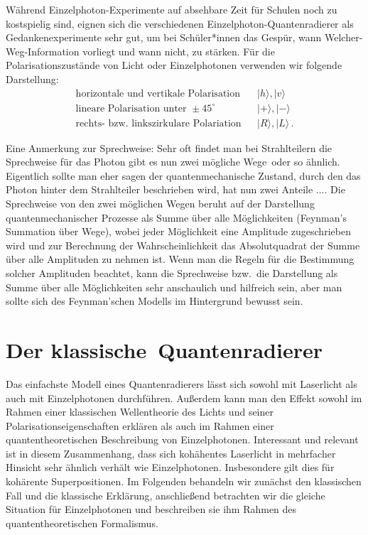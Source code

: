 W\"ahrend Einzelphoton-Experimente auf absehbare Zeit f\"ur Schulen noch zu kostspielig sind,
eignen sich die verschiedenen Einzelphoton-Quantenradierer als Gedankenexperimente 
sehr gut, um bei Sch\"uler*innen
das Gesp\"ur, wann \glqq Welcher-Weg\grqq-Information vorliegt und wann nicht, zu st\"arken.
F\"ur die Polarisationszust\"ande von Licht oder Einzelphotonen verwenden wir folgende
Darstellung:
\begin{eqnarray}
   \mbox{horizontale und vertikale Polarisation} & & |h\rangle , |v \rangle \\
   \mbox{lineare Polarisation unter } \pm 45^\circ & & |+\rangle , | - \rangle \\
   \mbox{rechts- bzw.\ linkszirkulare Polariation} & & |R\rangle , |L \rangle \, .
\end{eqnarray}

Eine Anmerkung zur Sprechweise: Sehr oft findet man bei Strahlteilern die Sprechweise
\glqq f\"ur das Photon gibt es nun zwei m\"ogliche Wege\grqq\ oder so \"ahnlich. Eigentlich
sollte man eher sagen \glqq der quantenmechanische Zustand, durch den das Photon hinter 
dem Strahlteiler beschrieben wird, hat nun zwei Anteile ...\grqq. Die Sprechweise von den
zwei m\"oglichen Wegen beruht auf der Darstellung quantenmechanischer Prozesse
als Summe \"uber alle M\"oglichkeiten 
(Feynman's Summation \"uber Wege),
wobei jeder M\"oglichkeit eine Amplitude zugeschrieben wird und zur Berechnung der
Wahrscheinlichkeit das Absolutquadrat der Summe \"uber alle Amplituden zu nehmen ist. 
Wenn man die Regeln f\"ur die Bestimmung solcher Amplituden beachtet, kann die
Sprechweise bzw.\ die Darstellung als Summe \"uber alle M\"oglichkeiten sehr anschaulich
und hilfreich sein, aber man sollte sich des Feynman'schen Modells im Hintergrund bewusst sein.


\section{Der \glqq klassische\grqq\ Quantenradierer}

Das einfachste Modell eines Quantenradierers l\"asst sich sowohl mit Laserlicht als auch
mit Einzelphotonen durchf\"uhren. Au\ss erdem kann man den Effekt sowohl im 
Rahmen einer klassischen Wellentheorie
des Lichts und seiner Polarisationseigenschaften erkl\"aren als auch im Rahmen einer
quantentheoretischen Beschreibung von Einzelphotonen. Interessant und relevant ist in diesem
Zusammenhang, dass sich koh\"ahentes Laserlicht in mehrfacher Hinsicht sehr \"ahnlich verh\"alt
wie Einzelphotonen. Insbesondere gilt dies f\"ur koh\"arente Superpositionen.
Im Folgenden behandeln wir zun\"achst den klassischen Fall und die
klassische Erkl\"arung, anschlie\ss end betrachten wir die gleiche Situation f\"ur Einzelphotonen
und beschreiben sie ihm Rahmen des quantentheoretischen Formalismus. 

